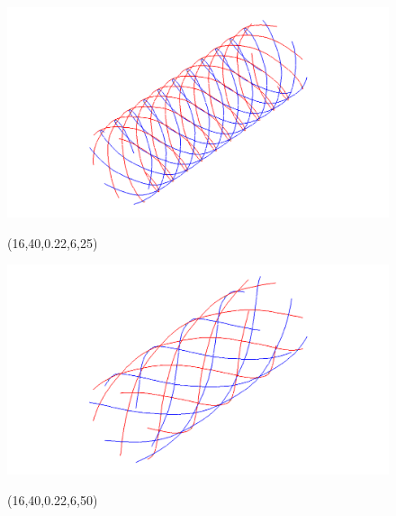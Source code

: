 \begin{figure} [ht]
   \centering
   \begin{makeimage}
   \end{makeimage}
   \begin{latexonly}
	\hspace{0.1cm}
	\begin{minipage} [c] [] [c]{5.5cm} 
	\includegraphics [width =\textwidth] {images/WireStentD16L40d22n6b25}
	\begin{center}
	\vspace{-3ex}
	(16,40,0.22,6,25)
	\vspace{1ex}
	\end{center}
\end{minipage}
\hspace{0.3cm}
\begin{minipage} [c] [] [c] {5.5cm}
	\includegraphics [width =\textwidth] {images/WireStentD16L40d22n6b50}
	\begin{center}
	\vspace{-3ex}
	(16,40,0.22,6,50)
	\vspace{1ex}
	\end{center}

\end{minipage}
\end{latexonly}
\end{figure}
